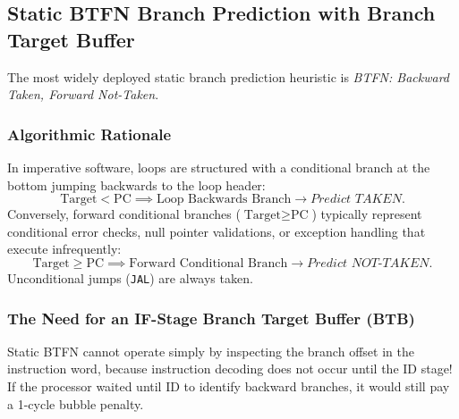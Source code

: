 \subsection{Static BTFN Branch Prediction with Branch Target Buffer}

The most widely deployed static branch prediction heuristic is \textit{BTFN: Backward Taken, Forward Not-Taken}.

\subsubsection{Algorithmic Rationale}
In imperative software, loops are structured with a conditional branch at the bottom jumping backwards to the loop header:
\begin{equation}
\text{Target} < \text{PC} \implies \text{Loop Backwards Branch} \longrightarrow \textit{Predict TAKEN}.
\end{equation}
Conversely, forward conditional branches ($\text{Target} \ge \text{PC}$) typically represent conditional error checks, null pointer validations, or exception handling that execute infrequently:
\begin{equation}
\text{Target} \ge \text{PC} \implies \text{Forward Conditional Branch} \longrightarrow \textit{Predict NOT-TAKEN}.
\end{equation}
Unconditional jumps (\texttt{JAL}) are always taken.

\subsubsection{The Need for an IF-Stage Branch Target Buffer (BTB)}
Static BTFN cannot operate simply by inspecting the branch offset in the instruction word, because instruction decoding does not occur until the \textsc{ID} stage! If the processor waited until \textsc{ID} to identify backward branches, it would still pay a 1-cycle bubble penalty.

